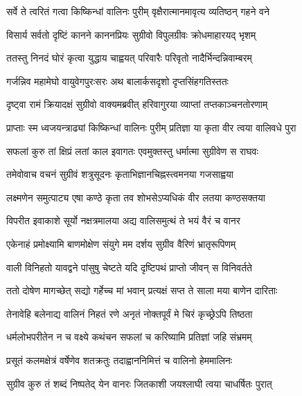 
\twolineshloka
{सर्वे ते त्वरितं गत्वा किष्किन्धां वालिनः पुरीम्}
{वृक्षैरात्मानमावृत्य व्यतिष्ठन् गहने वने} %

\twolineshloka
{विसार्य सर्वतो दृष्टिं कानने काननप्रियः}
{सुग्रीवो विपुलग्रीवः क्रोधमाहारयद् भृशम्} %

\twolineshloka
{ततस्तु निनदं घोरं कृत्वा युद्धाय चाह्वयत्}
{परिवारैः परिवृतो नादैर्भिन्दन्निवाम्बरम्} %

\twolineshloka
{गर्जन्निव महामेघो वायुवेगपुरःसरः}
{अथ बालार्कसदृशो दृप्तसिंहगतिस्ततः} %

\twolineshloka
{दृष्ट्वा रामं क्रियादक्षं सुग्रीवो वाक्यमब्रवीत्}
{हरिवागुरया व्याप्तां तप्तकाञ्चनतोरणाम्} %

\twolineshloka
{प्राप्ताः स्म ध्वजयन्त्राढ्यां किष्किन्धां वालिनः पुरीम्}
{प्रतिज्ञा या कृता वीर त्वया वालिवधे पुरा} %

\twolineshloka
{सफलां कुरु तां क्षिप्रं लतां काल इवागतः}
{एवमुक्तस्तु धर्मात्मा सुग्रीवेण स राघवः} %

\twolineshloka
{तमेवोवाच वचनं सुग्रीवं शत्रुसूदनः}
{कृताभिज्ञानचिह्नस्त्वमनया गजसाह्वया} %

\twolineshloka
{लक्ष्मणेन समुत्पाट्य एषा कण्ठे कृता तव}
{शोभसेऽप्यधिकं वीर लतया कण्ठसक्तया} %

\twolineshloka
{विपरीत इवाकाशे सूर्यो नक्षत्रमालया}
{अद्य वालिसमुत्थं ते भयं वैरं च वानर} %

\twolineshloka
{एकेनाहं प्रमोक्ष्यामि बाणमोक्षेण संयुगे}
{मम दर्शय सुग्रीव वैरिणं भ्रातृरूपिणम्} %

\twolineshloka
{वाली विनिहतो यावद्वने पांसुषु चेष्टते}
{यदि दृष्टिपथं प्राप्तो जीवन् स विनिवर्तते} %

\twolineshloka
{ततो दोषेण मागच्छेत् सद्यो गर्हेच्च मां भवान्}
{प्रत्यक्षं सप्त ते साला मया बाणेन दारिताः} %

\twolineshloka
{तेनावेहि बलेनाद्य वालिनं निहतं रणे}
{अनृतं नोक्तपूर्वं मे चिरं कृच्छ्रेऽपि तिष्ठता} %

\twolineshloka
{धर्मलोभपरीतेन न च वक्ष्ये कथंचन}
{सफलां च करिष्यामि प्रतिज्ञां जहि संभ्रमम्} %

\twolineshloka
{प्रसूतं कलमक्षेत्रं वर्षेणेव शतक्रतुः}
{तदाह्वाननिमित्तं च वालिनो हेममालिनः} %

\twolineshloka
{सुग्रीव कुरु तं शब्दं निष्पतेद् येन वानरः}
{जितकाशी जयश्लाघी त्वया चाधर्षितः पुरात्} %

